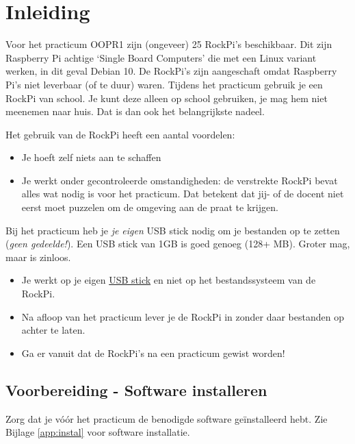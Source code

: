 \chapter{Inleiding}
Voor het practicum OOPR1 zijn (ongeveer) 25 RockPi’s beschikbaar. Dit zijn Raspberry Pi achtige ‘Single Board Computers’ die met een Linux variant werken, in dit geval Debian 10. De RockPi’s zijn aangeschaft omdat Raspberry Pi’s niet leverbaar (of te duur) waren.
Tijdens het practicum gebruik je een RockPi van school. Je kunt deze alleen op school gebruiken, je mag hem niet meenemen naar huis. Dat is dan ook het belangrijkste nadeel.

Het gebruik van de RockPi heeft een aantal voordelen:
\begin{itemize}
\item Je hoeft zelf niets aan te schaffen
\item Je werkt onder gecontroleerde omstandigheden: de verstrekte RockPi bevat alles wat nodig is voor het practicum. Dat betekent dat jij- of de docent niet eerst moet puzzelen om de omgeving aan de praat te krijgen.
\end{itemize}

\hypertarget{USBinleiding}{}
Bij het practicum heb je \textit{je eigen} USB stick nodig om je bestanden op te zetten (\textit{geen gedeelde!}). Een USB stick van 1GB is goed genoeg (128+ MB). Groter mag, maar is zinloos.
\begin{itemize}
\item Je werkt op je eigen \hyperlink{chp:USBstick}{USB stick} en niet op het bestandssysteem van de RockPi. 
\item Na afloop van het practicum lever je de RockPi in zonder daar bestanden op achter te laten. 
\item Ga er vanuit dat de RockPi’s na een practicum gewist worden!
\end{itemize}

\section{Voorbereiding - Software installeren}
Zorg dat je vóór het practicum de benodigde software geïnstalleerd hebt.
Zie Bijlage \ref{app:instal} voor software installatie.
\newpage

